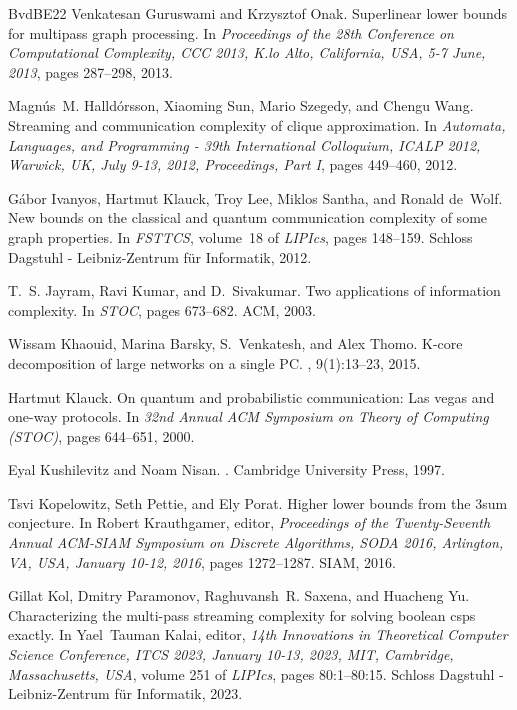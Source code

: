 \documentclass[11pt,letterpaper]{article}
\theoremstyle{definition}
\begin{document}
\begin{thebibliography}{BvdBE{\etalchar{+}}22}
Venkatesan Guruswami and Krzysztof Onak.
\newblock Superlinear lower bounds for multipass graph processing.
\newblock In {\em Proceedings of the 28th Conference on Computational Complexity, {CCC} 2013, K.lo Alto, California, USA, 5-7 June, 2013}, pages 287--298, 2013.

Magn{\'{u}}s~M. Halld{\'{o}}rsson, Xiaoming Sun, Mario Szegedy, and Chengu Wang.
\newblock Streaming and communication complexity of clique approximation.
\newblock In {\em Automata, Languages, and Programming - 39th International Colloquium, {ICALP} 2012, Warwick, UK, July 9-13, 2012, Proceedings, Part {I}}, pages 449--460, 2012.

G{\'{a}}bor Ivanyos, Hartmut Klauck, Troy Lee, Miklos Santha, and Ronald de~Wolf.
\newblock New bounds on the classical and quantum communication complexity of some graph properties.
\newblock In {\em {FSTTCS}}, volume~18 of {\em LIPIcs}, pages 148--159. Schloss Dagstuhl - Leibniz-Zentrum f{\"{u}}r Informatik, 2012.

T.~S. Jayram, Ravi Kumar, and D.~Sivakumar.
\newblock Two applications of information complexity.
\newblock In {\em {STOC}}, pages 673--682. {ACM}, 2003.

Wissam Khaouid, Marina Barsky, S.~Venkatesh, and Alex Thomo.
\newblock K-core decomposition of large networks on a single {PC}.
, 9(1):13--23, 2015.

Hartmut Klauck.
\newblock On quantum and probabilistic communication: Las vegas and one-way protocols.
\newblock In {\em 32nd Annual ACM Symposium on Theory of Computing ({STOC})}, pages 644--651, 2000.

Eyal Kushilevitz and Noam Nisan.
.
\newblock Cambridge University Press, 1997.

Tsvi Kopelowitz, Seth Pettie, and Ely Porat.
\newblock Higher lower bounds from the 3sum conjecture.
\newblock In Robert Krauthgamer, editor, {\em Proceedings of the Twenty-Seventh Annual {ACM-SIAM} Symposium on Discrete Algorithms, {SODA} 2016, Arlington, VA, USA, January 10-12, 2016}, pages 1272--1287. {SIAM}, 2016.

Gillat Kol, Dmitry Paramonov, Raghuvansh~R. Saxena, and Huacheng Yu.
\newblock Characterizing the multi-pass streaming complexity for solving boolean csps exactly.
\newblock In Yael~Tauman Kalai, editor, {\em 14th Innovations in Theoretical Computer Science Conference, {ITCS} 2023, January 10-13, 2023, MIT, Cambridge, Massachusetts, {USA}}, volume 251 of {\em LIPIcs}, pages 80:1--80:15. Schloss Dagstuhl - Leibniz-Zentrum f{\"{u}}r Informatik, 2023.


\end{thebibliography}
\end{document}
